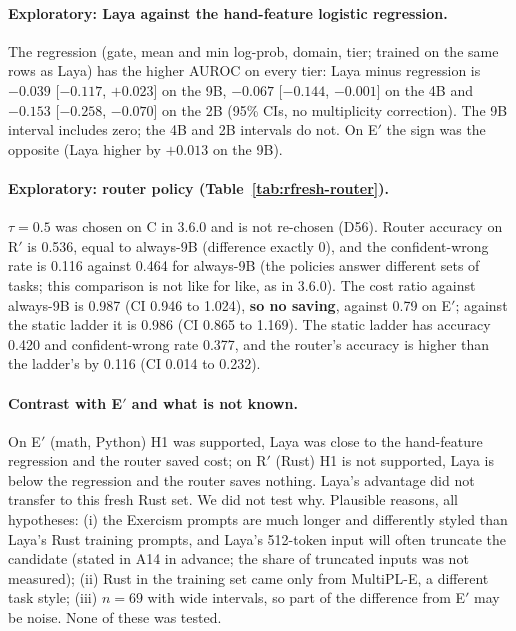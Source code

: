 \documentclass[11pt,a4paper]{article}
\begin{document}
\paragraph{Exploratory: Laya against the hand-feature logistic regression.} The regression (gate, mean and min log-prob, domain, tier; trained on the same rows as Laya) has the higher AUROC on every tier: Laya minus regression is $-0.039$ [$-0.117$, $+0.023$] on the 9B, $-0.067$ [$-0.144$, $-0.001$] on the 4B and $-0.153$ [$-0.258$, $-0.070$] on the 2B (95\% CIs, no multiplicity correction). The 9B interval includes zero; the 4B and 2B intervals do not. On E$'$ the sign was the opposite (Laya higher by $+0.013$ on the 9B).

\paragraph{Exploratory: router policy (Table~\ref{tab:rfresh-router}).} $\tau=0.5$ was chosen on C in 3.6.0 and is not re-chosen (D56). Router accuracy on R$'$ is 0.536, equal to always-9B (difference exactly $0$), and the confident-wrong rate is 0.116 against 0.464 for always-9B (the policies answer different sets of tasks; this comparison is not like for like, as in 3.6.0). The cost ratio against always-9B is 0.987 (CI 0.946 to 1.024), \textbf{so no saving}, against 0.79 on E$'$; against the static ladder it is 0.986 (CI 0.865 to 1.169). The static ladder has accuracy 0.420 and confident-wrong rate 0.377, and the router's accuracy is higher than the ladder's by 0.116 (CI 0.014 to 0.232).

\paragraph{Contrast with E$'$ and what is not known.} On E$'$ (math, Python) H1 was supported, Laya was close to the hand-feature regression and the router saved cost; on R$'$ (Rust) H1 is not supported, Laya is below the regression and the router saves nothing. Laya's advantage did not transfer to this fresh Rust set. We did not test why. Plausible reasons, all hypotheses: (i) the Exercism prompts are much longer and differently styled than Laya's Rust training prompts, and Laya's 512-token input will often truncate the candidate (stated in A14 in advance; the share of truncated inputs was not measured); (ii) Rust in the training set came only from MultiPL-E, a different task style; (iii) $n=69$ with wide intervals, so part of the difference from E$'$ may be noise. None of these was tested.
\end{document}
